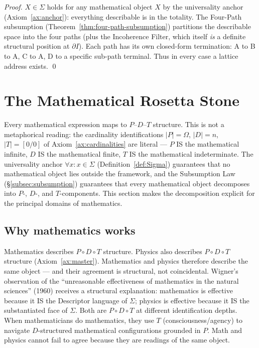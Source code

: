 \documentclass[11pt,a4paper]{article}
\theoremstyle{definition}
\theoremstyle{remark}
\begin{document}
\begin{proof}
$X \in \Sigma$ holds for any mathematical object $X$ by the universality anchor (Axiom~\ref{ax:anchor}): everything describable is in the totality. The Four-Path subsumption (Theorem~\ref{thm:four-path-subsumption}) partitions the describable space into the four paths (plus the Incoherence Filter, which itself \emph{is} a definite structural position at $\partial I$). Each path has its own closed-form termination: A to B to A, C to A, D to a specific sub-path terminal. Thus in every case a lattice address exists. \qed
\end{proof}



\section{The Mathematical Rosetta Stone}\label{sec:rosetta}

Every mathematical expression maps to $P$--$D$--$T$ structure. This is not a metaphorical reading: the cardinality identifications $|P| = \Omega$, $|D| = n$, $|T| = [0/0]$ of Axiom~\ref{ax:cardinalities} are literal --- $P$ IS the mathematical infinite, $D$ IS the mathematical finite, $T$ IS the mathematical indeterminate. The universality anchor $\forall x: x \in \Sigma$ (Definition~\ref{def:Sigma}) guarantees that no mathematical object lies outside the framework, and the Subsumption Law (\S\ref{subsec:subsumption}) guarantees that every mathematical object decomposes into $P$-, $D$-, and $T$-components. This section makes the decomposition explicit for the principal domains of mathematics.

\subsection{Why mathematics works}\label{subsec:math-works}

Mathematics describes $P \circ D \circ T$ structure. Physics also describes $P \circ D \circ T$ structure (Axiom~\ref{ax:master}). Mathematics and physics therefore describe the same object --- and their agreement is structural, not coincidental. Wigner's observation of the ``unreasonable effectiveness of mathematics in the natural sciences'' (1960) receives a structural explanation: mathematics is effective because it IS the Descriptor language of $\Sigma$; physics is effective because it IS the substantiated face of $\Sigma$. Both are $P \circ D \circ T$ at different identification depths. When mathematicians do mathematics, they use $T$ (consciousness/agency) to navigate $D$-structured mathematical configurations grounded in $P$. Math and physics cannot fail to agree because they are readings of the same object.
\end{document}
